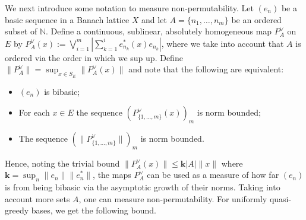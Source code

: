 \documentclass[12pt,leqno]{amsart}
\numberwithin{equation}{section}
\theoremstyle{definition}
\def\N{{\mathbb N}}
\begin{document}
We next introduce some notation to measure non-permutability. Let $(e_n)$ be a basic sequence in a Banach lattice $X$ and let $A=\{n_1,\dots,n_m\}$ be an ordered subset of $\N$. Define a continuous, sublinear, absolutely homogeneous map $P_A^\vee$ on $E$ by $P_A^\vee(x):=\bigvee_{i=1}^m\left|\sum_{k=1}^i e_{n_k}^*(x)e_{n_k}\right|$, where we take into account that $A$ is ordered via the order in which we sup up. Define   $\|P_A^\vee\|=\sup_{x\in S_E}\big\|P_A^\vee(x)\big\|$ and note that the following are equivalent:
\begin{itemize}
\item $(e_n)$ is bibasic;
\item For each $x\in E$ the sequence $(P_{\{1,\dots,m\}}^\vee(x))_m$ is norm bounded;
\item The sequence $(\|P_{\{1,\dots,m\}}^{\vee}\|)_m$ is norm bounded.
\end{itemize}
Hence, noting the trivial bound $\|P_A^\vee(x)\|\leq \textbf{k}|A|\|x\|$ where $\textbf{k}=\sup_n\|e_n\|\|e_n^*\|$, the maps $P_A^\vee$ can be used as a measure of how far $(e_n)$ is from being bibasic via the asymptotic growth of their norms. Taking into account more sets $A$, one can measure non-permutability. For uniformly quasi-greedy bases, we get the following bound.
\end{document}
